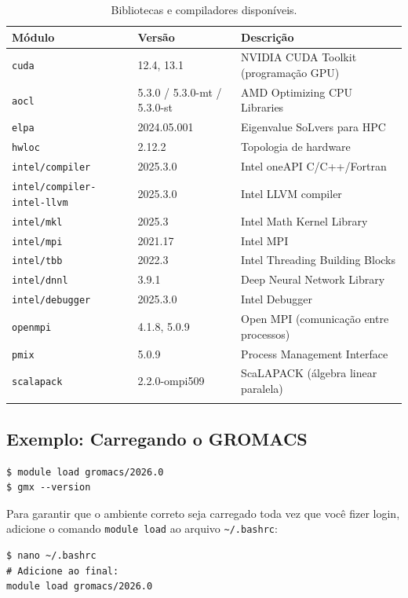 \documentclass[11pt, a4paper]{article}
\newcommand{\cmd}[1]{\texttt{\textcolor{codeblue}{#1}}}
\begin{document}
\begin{longtable}{lll}
  \toprule
  \textbf{Módulo} & \textbf{Versão} & \textbf{Descrição} \\
  \midrule
  \endhead
  \texttt{cuda} & 12.4, 13.1 & NVIDIA CUDA Toolkit (programação GPU) \\
  \texttt{aocl} & 5.3.0 / 5.3.0-mt / 5.3.0-st & AMD Optimizing CPU Libraries \\
  \texttt{elpa} & 2024.05.001 & Eigenvalue SoLvers para HPC \\
  \texttt{hwloc} & 2.12.2 & Topologia de hardware \\
  \texttt{intel/compiler} & 2025.3.0 & Intel oneAPI C/C++/Fortran \\
  \texttt{intel/compiler-intel-llvm} & 2025.3.0 & Intel LLVM compiler \\
  \texttt{intel/mkl} & 2025.3 & Intel Math Kernel Library \\
  \texttt{intel/mpi} & 2021.17 & Intel MPI \\
  \texttt{intel/tbb} & 2022.3 & Intel Threading Building Blocks \\
  \texttt{intel/dnnl} & 3.9.1 & Deep Neural Network Library \\
  \texttt{intel/debugger} & 2025.3.0 & Intel Debugger \\
  \texttt{openmpi} & 4.1.8, 5.0.9 & Open MPI (comunicação entre processos) \\
  \texttt{pmix} & 5.0.9 & Process Management Interface \\
  \texttt{scalapack} & 2.2.0-ompi509 & ScaLAPACK (álgebra linear paralela) \\
  \bottomrule
  \caption{Bibliotecas e compiladores disponíveis.}
\end{longtable}

\subsection{Exemplo: Carregando o GROMACS}

\begin{lstlisting}[style=terminal]
$ module load gromacs/2026.0
$ gmx --version
\end{lstlisting}

\begin{dica}
  Para garantir que o ambiente correto seja carregado toda vez que você fizer
  login, adicione o comando \cmd{module load} ao arquivo \texttt{\textasciitilde/.bashrc}:
  \begin{lstlisting}[style=terminal]
$ nano ~/.bashrc
# Adicione ao final:
module load gromacs/2026.0
  \end{lstlisting}
\end{dica}
\end{document}
